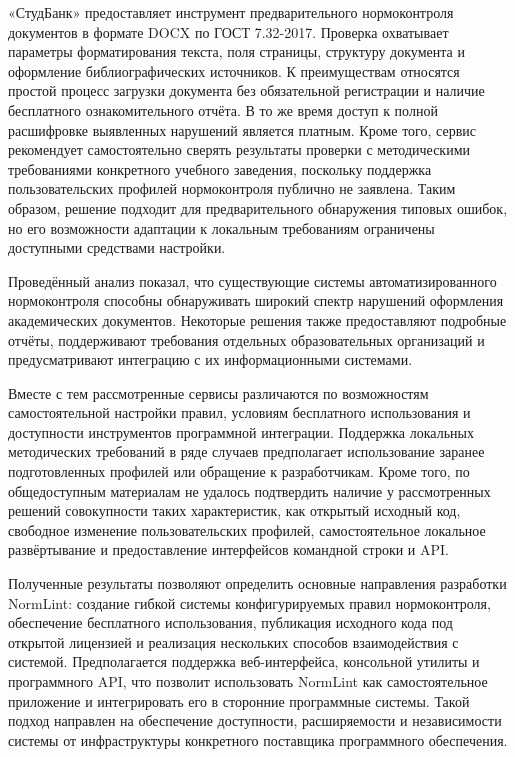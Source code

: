 \documentclass[a4paper,14pt]{extarticle}
\begin{document}
«СтудБанк» предоставляет инструмент предварительного нормоконтроля документов в формате DOCX по ГОСТ 7.32-2017. Проверка охватывает параметры форматирования текста, поля страницы, структуру документа и оформление библиографических источников. К преимуществам относятся простой процесс загрузки документа без обязательной регистрации и наличие бесплатного ознакомительного отчёта. В то же время доступ к полной расшифровке выявленных нарушений является платным. Кроме того, сервис рекомендует самостоятельно сверять результаты проверки с методическими требованиями конкретного учебного заведения, поскольку поддержка пользовательских профилей нормоконтроля публично не заявлена. Таким образом, решение подходит для предварительного обнаружения типовых ошибок, но его возможности адаптации к локальным требованиям ограничены доступными средствами настройки.

Проведённый анализ показал, что существующие системы автоматизированного нормоконтроля способны обнаруживать широкий спектр нарушений оформления академических документов. Некоторые решения также предоставляют подробные отчёты, поддерживают требования отдельных образовательных организаций и предусматривают интеграцию с их информационными системами.

Вместе с тем рассмотренные сервисы различаются по возможностям самостоятельной настройки правил, условиям бесплатного использования и доступности инструментов программной интеграции. Поддержка локальных методических требований в ряде случаев предполагает использование заранее подготовленных профилей или обращение к разработчикам. Кроме того, по общедоступным материалам не удалось подтвердить наличие у рассмотренных решений совокупности таких характеристик, как открытый исходный код, свободное изменение пользовательских профилей, самостоятельное локальное развёртывание и предоставление интерфейсов командной строки и API.

Полученные результаты позволяют определить основные направления разработки NormLint: создание гибкой системы конфигурируемых правил нормоконтроля, обеспечение бесплатного использования, публикация исходного кода под открытой лицензией и реализация нескольких способов взаимодействия с системой. Предполагается поддержка веб-интерфейса, консольной утилиты и программного API, что позволит использовать NormLint как самостоятельное приложение и интегрировать его в сторонние программные системы. Такой подход направлен на обеспечение доступности, расширяемости и независимости системы от инфраструктуры конкретного поставщика программного обеспечения.
\end{document}
